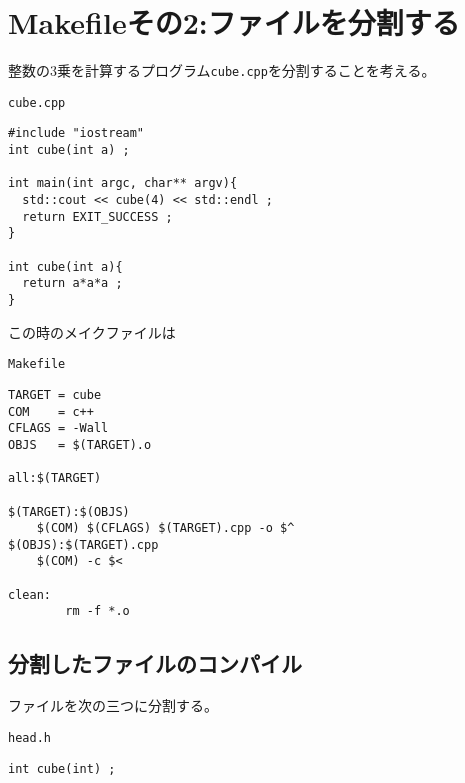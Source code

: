  \section{Makefileその2:ファイルを分割する}
 
 
 

整数の3乗を計算するプログラム\texttt{cube.cpp}を分割することを考える。
\begin{itembox}{\texttt{cube.cpp}}
 \begin{verbatim}
#include "iostream"
int cube(int a) ;

int main(int argc, char** argv){
  std::cout << cube(4) << std::endl ;
  return EXIT_SUCCESS ;
}

int cube(int a){
  return a*a*a ;
}
 \end{verbatim}
\end{itembox}
この時のメイクファイルは
\begin{itembox}{\texttt{Makefile}}
\begin{verbatim}
TARGET = cube
COM    = c++
CFLAGS = -Wall
OBJS   = $(TARGET).o

all:$(TARGET)

$(TARGET):$(OBJS)
	$(COM) $(CFLAGS) $(TARGET).cpp -o $^
$(OBJS):$(TARGET).cpp
	$(COM) -c $<

clean:
        rm -f *.o
\end{verbatim}
\end{itembox}
	
	
	
\clearpage
 \subsection{分割したファイルのコンパイル}

ファイルを次の三つに分割する。
\begin{itembox}{\texttt{head.h}}
\begin{verbatim}
int cube(int) ;
\end{verbatim}
\end{itembox}

